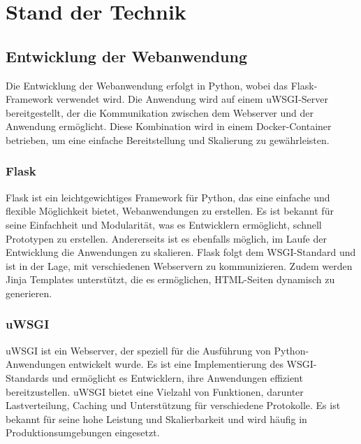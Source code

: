 


\chapter{Stand der Technik}\label{c:2}

\section{Entwicklung der Webanwendung}\label{c:2_s:dev-webapp}

Die Entwicklung der Webanwendung erfolgt in Python, wobei das Flask-Framework verwendet wird. Die Anwendung wird auf einem u\ac{WSGI}-Server bereitgestellt, der die Kommunikation zwischen dem Webserver und der Anwendung ermöglicht. Diese Kombination wird in einem Docker-Container betrieben, um eine einfache Bereitstellung und Skalierung zu gewährleisten. 

\subsection{Flask}\label{c:2_ss:flask}
Flask ist ein leichtgewichtiges Framework für Python, das eine einfache und flexible Möglichkeit bietet, Webanwendungen zu erstellen. Es ist bekannt für seine Einfachheit und Modularität, was es Entwicklern ermöglicht, schnell Prototypen zu erstellen. Andererseits ist es ebenfalls möglich, im Laufe der Entwicklung die Anwendungen zu skalieren. Flask folgt dem \ac{WSGI}-Standard und ist in der Lage, mit verschiedenen Webservern zu kommunizieren. Zudem werden Jinja Templates unterstützt, die es ermöglichen, HTML-Seiten dynamisch zu generieren. 
\cite{flask}

\subsection{uWSGI}\label{c:2_ss:uwsgi}
u\ac{WSGI} ist ein Webserver, der speziell für die Ausführung von Python-Anwendungen entwickelt wurde. Es ist eine Implementierung des \ac{WSGI}-Standards und ermöglicht es Entwicklern, ihre Anwendungen effizient bereitzustellen. u\ac{WSGI} bietet eine Vielzahl von Funktionen, darunter Lastverteilung, Caching und Unterstützung für verschiedene Protokolle. Es ist bekannt für seine hohe Leistung und Skalierbarkeit und wird häufig in Produktionsumgebungen eingesetzt.
\cite{uwsgi}

